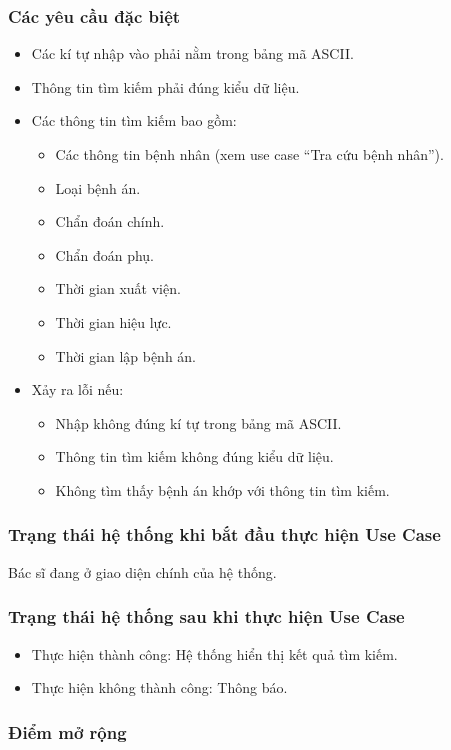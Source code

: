 \subsubsection{Các yêu cầu đặc biệt}
\begin{itemize}
  \item Các kí tự nhập vào phải nằm trong bảng mã ASCII.
  \item Thông tin tìm kiếm phải đúng kiểu dữ liệu.
  \item Các thông tin tìm kiếm bao gồm:
    \begin{itemize}
      \item Các thông tin bệnh nhân (xem use case ``Tra cứu bệnh nhân'').
      \item Loại bệnh án.
      \item Chẩn đoán chính.
      \item Chẩn đoán phụ.
      \item Thời gian xuất viện.
      \item Thời gian hiệu lực.
      \item Thời gian lập bệnh án.
    \end{itemize}
  \item Xảy ra lỗi nếu:
    \begin{itemize}
      \item Nhập không đúng kí tự trong bảng mã ASCII.
      \item Thông tin tìm kiếm không đúng kiểu dữ liệu.
      \item Không tìm thấy bệnh án khớp với thông tin tìm kiếm.
    \end{itemize}
\end{itemize}

\subsubsection{Trạng thái hệ thống khi bắt đầu thực hiện Use Case}
Bác sĩ đang ở giao diện chính của hệ thống.

\subsubsection{Trạng thái hệ thống sau khi thực hiện Use Case}
\begin{itemize}
  \item Thực hiện thành công: Hệ thống hiển thị kết quả tìm kiếm.
  \item Thực hiện không thành công: Thông báo.
\end{itemize}

\subsubsection{Điểm mở rộng}